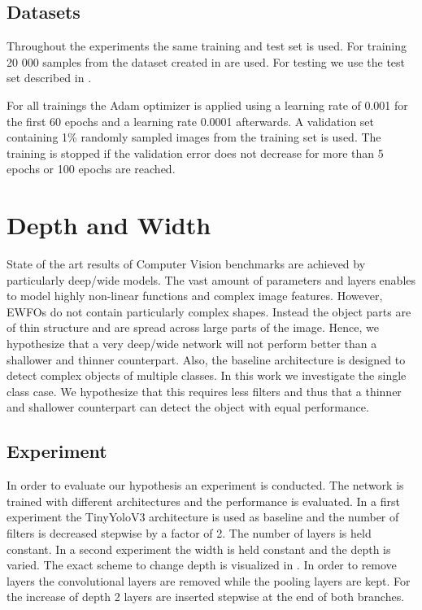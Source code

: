 	\subsection{Datasets}
	
	Throughout the experiments the same training and test set is used. For training 20 000 samples from the dataset created in  are used. For testing we use the test set described in .

	For all trainings the Adam optimizer is applied using a learning rate of 0.001 for the first 60 epochs and a learning rate 0.0001 afterwards. A validation set containing 1\% randomly sampled images from the training set is used. The training is stopped if the validation error does not decrease for more than 5 epochs or 100 epochs are reached.
	
	\section{Depth and Width}
	
	State of the art results of Computer Vision benchmarks are achieved by particularly deep/wide models. The vast amount of parameters and layers enables to model highly non-linear functions and complex image features. However, \acp{EWFO} do not contain particularly complex shapes. Instead the object parts are of thin structure and are spread across large parts of the image. Hence, we hypothesize that a very deep/wide network will not perform better than a shallower and thinner counterpart. Also, the baseline architecture is designed to detect complex objects of multiple classes. In this work we investigate the single class case. We hypothesize that this requires less filters and thus that a thinner and shallower counterpart can detect the object with equal performance.
	
	\subsection{Experiment}
	
	In order to evaluate our hypothesis an experiment is conducted. The network is trained with different architectures and the performance is evaluated. In a first experiment the TinyYoloV3 architecture is used as baseline and the number of filters is decreased stepwise by a factor of 2. The number of layers is held constant. In a second experiment the width is held constant and the depth is varied. The exact scheme to change depth is visualized in . In order to remove layers the convolutional layers are removed while the pooling layers are kept. For the increase of depth 2 layers are inserted stepwise at the end of both branches.  
	
